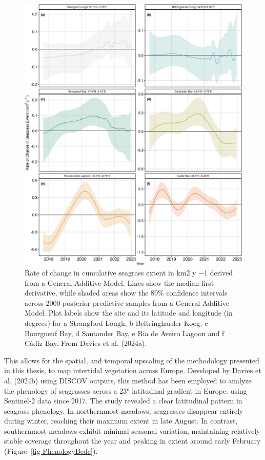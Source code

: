 \documentclass[
  letterpaper,
  11pt,
  english,
  singlespacing,
  headsepline]{MastersDoctoralThesis}
\begin{document}
\begin{spacing}{1.5}
\begin{figure}
{\includegraphics[width=0.9\linewidth,height=\textheight,keepaspectratio]{Chapter6/Figs/TrendsBede.jpg}

}

\caption{\label{fig-TrendsBede}Rate of change in cumulative seagrass
extent in km2 y −1 derived from a General Additive Model. Lines show the
median first derivative, while shaded areas show the 89\% confidence
intervals across 2000 posterior predictive samples from a General
Additive Model. Plot labels show the site and its latitude and longitude
(in degrees) for a Strangford Lough, b Beltringharder Koog, c Bourgneuf
Bay, d Santander Bay, e Ria de Aveiro Lagoon and f Cádiz Bay. From
Davies et al. (2024a).}

\end{figure}%

This allows for the spatial, and temporal upscaling of the methodology
presented in this thesis, to map intertidal vegetation across Europe.
Developed by Davies et al. (2024b) using DISCOV outputs, this method has
been employed to analyze the phenology of seagrasses across a 23°
latitudinal gradient in Europe. using Sentinel-2 data since 2017. The
study revealed a clear latitudinal pattern in seagrass phenology. In
northernmost meadows, seagrasses disappear entirely during winter,
reaching their maximum extent in late August. In contrast, southernmost
meadows exhibit minimal seasonal variation, maintaining relatively
stable coverage throughout the year and peaking in extent around early
February (Figure~\ref{fig-PhenologyBede}).


\end{spacing}
\end{document}
